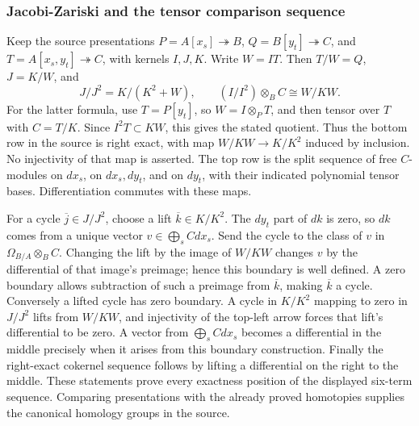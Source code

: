 \subsubsection{Jacobi-Zariski and the tensor comparison sequence}\label{algebra-proof-044-jacobi-zariski-and-the-tensor-comparison-sequence}

Keep the source presentations \(P=A[x_s]\twoheadrightarrow B\), \(Q=B[y_t]\twoheadrightarrow C\), and \(T=A[x_s,y_t]\twoheadrightarrow C\), with kernels \(I,J,K\). Write \(W=IT\). Then \(T/W=Q\), \(J=K/W\), and \[
J/J^2=K/(K^2+W),\qquad
(I/I^2)\otimes_B C\cong W/KW.
\] For the latter formula, use \(T=P[y_t]\), so \(W=I\otimes_P T\), and then tensor over \(T\) with \(C=T/K\). Since \(I^2T\subset KW\), this gives the stated quotient. Thus the bottom row in the source is right exact, with map \(W/KW\to K/K^2\) induced by inclusion. No injectivity of that map is asserted. The top row is the split sequence of free \(C\)-modules on \(dx_s\), on \(dx_s,dy_t\), and on \(dy_t\), with their indicated polynomial tensor bases. Differentiation commutes with these maps.

For a cycle \(\overline j\in J/J^2\), choose a lift \(\overline k\in K/K^2\). The \(dy_t\) part of \(dk\) is zero, so \(dk\) comes from a unique vector \(v\in\bigoplus_s Cdx_s\). Send the cycle to the class of \(v\) in \(\Omega_{B/A}\otimes_B C\). Changing the lift by the image of \(W/KW\) changes \(v\) by the differential of that image's preimage; hence this boundary is well defined. A zero boundary allows subtraction of such a preimage from \(\overline k\), making \(\overline k\) a cycle. Conversely a lifted cycle has zero boundary. A cycle in \(K/K^2\) mapping to zero in \(J/J^2\) lifts from \(W/KW\), and injectivity of the top-left arrow forces that lift's differential to be zero. A vector from \(\bigoplus_s Cdx_s\) becomes a differential in the middle precisely when it arises from this boundary construction. Finally the right-exact cokernel sequence follows by lifting a differential on the right to the middle. These statements prove every exactness position of the displayed six-term sequence. Comparing presentations with the already proved homotopies supplies the canonical homology groups in the source.

